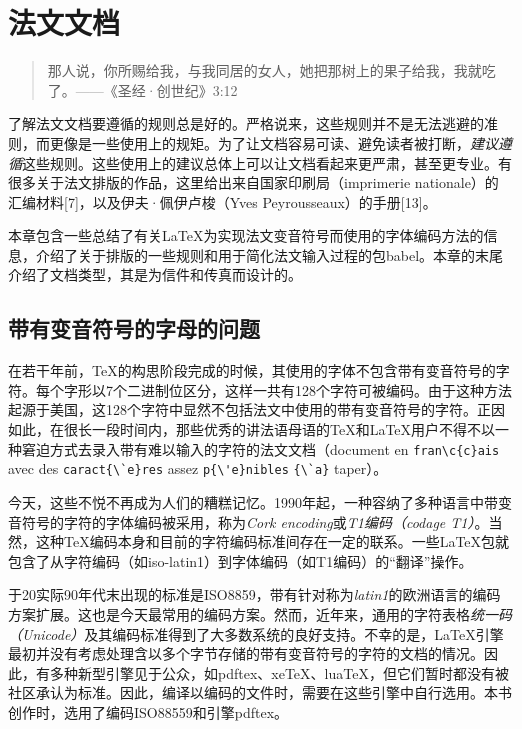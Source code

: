 \chapter{法文文档}

\begin{quote}
    那人说，你所赐给我，与我同居的女人，她把那树上的果子给我，我就吃了。——《圣经·创世纪》3:12
\end{quote}

了解法文文档要遵循的规则总是好的。严格说来，这些规则并不是无法逃避的准则，而更像是一些使用上的规矩。为了让文档容易可读、避免读者被打断，\emph{建议遵循}这些规则。这些使用上的建议总体上可以让文档看起来更严肃，甚至更专业。有很多关于法文排版的作品，这里给出来自国家印刷局（imprimerie nationale）的汇编材料[7]，以及伊夫·佩伊卢梭（Yves Peyrousseaux）的手册[13]。

本章包含一些总结了有关\LaTeX 为实现法文变音符号而使用的字体编码方法的信息，介绍了关于排版的一些规则和用于简化法文输入过程的包\textsf{babel}。本章的末尾介绍了文档类型，其是为信件和传真而设计的。

\section{带有变音符号的字母的问题}

在若干年前，\TeX 的构思阶段完成的时候，其使用的字体不包含带有变音符号的字符。每个字形以7个二进制位区分，这样一共有128个字符可被编码。由于这种方法起源于美国，这128个字符中显然不包括法文中使用的带有变音符号的字符。正因如此，在很长一段时间内，那些优秀的讲法语母语的\TeX 和\LaTeX 用户不得不以一种窘迫方式去录入带有难以输入的字符的法文文档（document en \verb+fran\c{c}ais+ avec des \verb+caract{\`e}res+ assez \verb+p{\'e}nibles+ \verb+{\`a}+ taper）。

今天，这些不悦不再成为人们的糟糕记忆。1990年起，一种容纳了多种语言中带变音符号的字符的字体编码被采用，称为\emph{Cork encoding}或\emph{T1编码（codage T1）}。当然，这种\TeX 编码本身和目前的字符编码标准间存在一定的联系。一些\LaTeX 包就包含了从字符编码（如iso-latin1）到字体编码（如T1编码）的“翻译”操作。

\begin{exclamation}
    于20实际90年代末出现的标准是ISO8859，带有针对称为\emph{latin1}的欧洲语言的编码方案扩展。这也是今天最常用的编码方案。然而，近年来，通用的字符表格\emph{统一码（Unicode）}及其编码标准得到了大多数系统的良好支持。不幸的是，\LaTeX 引擎最初并没有考虑处理含以多个字节存储的带有变音符号的字符的文档的情况。因此，有多种新型引擎见于公众，如pdftex、xe\TeX 、lua\TeX ，但它们暂时都没有被社区承认为标准。因此，编译以编码的文件时，需要在这些引擎中自行选用。本书创作时，选用了编码ISO88559和引擎pdftex。
\end{exclamation}

